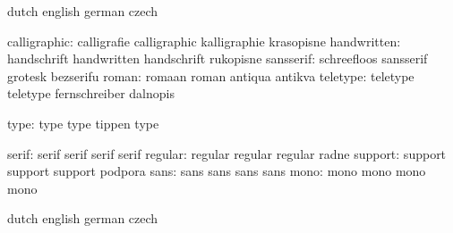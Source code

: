 


\startvariables       dutch                english             german
                      czech

       calligraphic:  calligrafie          calligraphic        kalligraphie
                      krasopisne
        handwritten:  handschrift          handwritten         handschrift
                      rukopisne
          sansserif:  schreefloos          sansserif           grotesk
                      bezserifu
              roman:  romaan               roman               antiqua
                      antikva
           teletype:  teletype             teletype            fernschreiber
                      dalnopis

               type:  type                 type                tippen
                      type

              serif:  serif                serif               serif
                      serif
            regular:  regular              regular             regular
                      radne
            support:  support              support             support
                      podpora
               sans:  sans                 sans                sans
                      sans
               mono:  mono                 mono                mono
                      mono

\stopvariables




\startsetupvariables  dutch                english             german
                      czech


